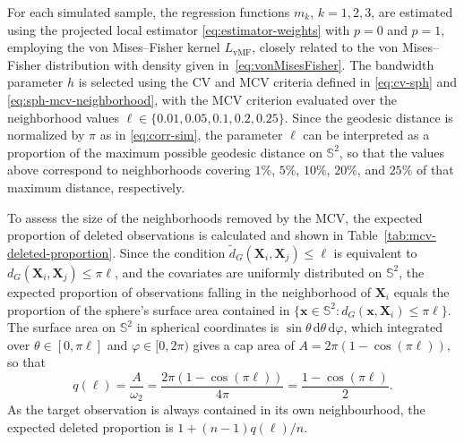 \documentclass[12pt]{report} %
\newcommand{\bX}{\mathbf{X}}
\newcommand{\bx}{\mathbf{x}}
\newcommand{\rd}{\mathrm{d}}
\begin{document}
For each simulated sample, the regression functions $m_k$, $k=1,2,3$, are estimated using the projected local estimator \eqref{eq:estimator-weights} with $p=0$ and $p=1$, employing the von Mises--Fisher kernel $L_{\mathrm{vMF}}$, closely related to the von Mises--Fisher distribution with density given in~\eqref{eq:vonMisesFisher}. The bandwidth parameter $h$ is selected using the CV and MCV criteria defined in \eqref{eq:cv-sph} and \eqref{eq:sph-mcv-neighborhood}, with the MCV criterion evaluated over the neighborhood values $\ell\in\{0.01,0.05,0.1,0.2,0.25\}$. Since the geodesic distance is normalized by $\pi$ as in \eqref{eq:corr-sim}, the parameter $\ell$ can be interpreted as a proportion of the maximum possible geodesic distance on $\mathbb{S}^2$, so that the values above correspond to neighborhoods covering $1\%$, $5\%$, $10\%$, $20\%$, and $25\%$ of that maximum distance, respectively.

  


To assess the size of the neighborhoods removed by the MCV, the expected proportion of deleted observations is calculated and shown in Table~\ref{tab:mcv-deleted-proportion}. Since the condition $\tilde{d}_G(\bX_i, \bX_j) \leq \ell$ is equivalent to $d_G(\bX_i, \bX_j) \leq \pi\ell$, and the covariates are uniformly distributed on $\mathbb{S}^2$, the expected proportion of observations falling in the neighborhood of $\bX_i$ equals the proportion of the sphere's surface area contained in $\{\bx \in \mathbb{S}^2 : d_G(\bx, \bX_i) \leq \pi\ell\}$. The surface area on $\mathbb{S}^2$ in spherical coordinates is $\sin \theta \, \rd\theta \, \rd \varphi$, which integrated over $\theta \in [0,\pi \ell]$ and $\varphi\in[0,2\pi)$ gives a cap area of $A=2\pi(1-\cos(\pi\ell))$, so that
\[
q(\ell) = \frac{A}{\omega_2} = \frac{2\pi(1-\cos(\pi\ell))}{4\pi} = \frac{1-\cos(\pi\ell)}{2}.
\]
As the target observation is always contained in its own neighbourhood, the expected deleted proportion is $1+(n-1)q(\ell)/n$.
\end{document}

